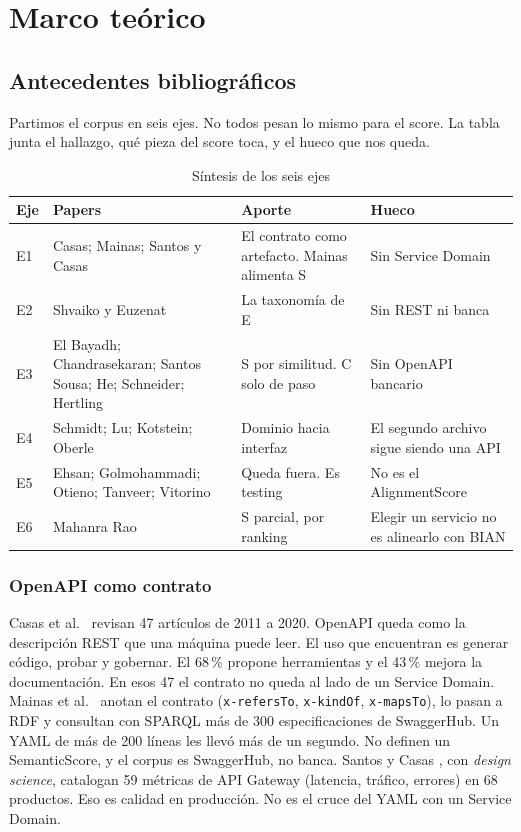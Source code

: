 \chapter{Marco teórico}

\section{Antecedentes bibliográficos}

Partimos el corpus en seis ejes. No todos pesan lo mismo para el score. La tabla junta el hallazgo, qué pieza del score toca, y el hueco que nos queda.

\begin{table}[H]
  \centering
  \caption{Síntesis de los seis ejes}
  \label{tab:ejes}
  \footnotesize
  \begin{tabular}{@{}p{}p{}p{}p{}@{}}
    \toprule
    Eje & Papers & Aporte & Hueco \\
    \midrule
    E1 & Casas; Mainas; Santos y Casas & El contrato como artefacto. Mainas alimenta S & Sin Service Domain \\
    E2 & Shvaiko y Euzenat & La taxonomía de E & Sin REST ni banca \\
    E3 & El Bayadh; Chandrasekaran; Santos Sousa; He; Schneider; Hertling & S por similitud. C solo de paso & Sin OpenAPI bancario \\
    E4 & Schmidt; Lu; Kotstein; Oberle & Dominio hacia interfaz & El segundo archivo sigue siendo una API \\
    E5 & Ehsan; Golmohammadi; Otieno; Tanveer; Vitorino & Queda fuera. Es testing & No es el AlignmentScore \\
    E6 & Mahanra Rao & S parcial, por ranking & Elegir un servicio no es alinearlo con BIAN \\
    \bottomrule
  \end{tabular}
\end{table}

\subsection{OpenAPI como contrato}

Casas et al.\ \cite{Casas2021} revisan 47 artículos de 2011 a 2020. OpenAPI queda como la descripción REST que una máquina puede leer. El uso que encuentran es generar código, probar y gobernar. El 68\,\% propone herramientas y el 43\,\% mejora la documentación. En esos 47 el contrato no queda al lado de un Service Domain. Mainas et al.\ \cite{Mainas2023} anotan el contrato (\texttt{x-refersTo}, \texttt{x-kindOf}, \texttt{x-mapsTo}), lo pasan a RDF y consultan con SPARQL más de 300 especificaciones de SwaggerHub. Un YAML de más de 200 líneas les llevó más de un segundo. No definen un SemanticScore, y el corpus es SwaggerHub, no banca. Santos y Casas \cite{SantosCasas2025}, con \textit{design science}, catalogan 59 métricas de API Gateway (latencia, tráfico, errores) en 68 productos. Eso es calidad en producción. No es el cruce del YAML con un Service Domain.

